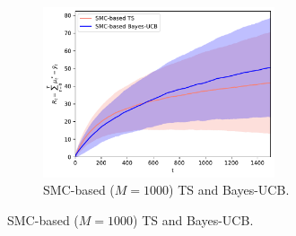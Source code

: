 \begin{figure}[!h]
	\centering
	\begin{subfigure}[b]{\textwidth}
		\centering
		\includegraphics[width=0.75\textwidth]{./fods_figs/static/logistic/A5/theta-1._-1._-0.5_-0.5_0._0._0.5_0.5_1._1._M1000_cumulative_regret}
		\caption{SMC-based ($M=1000$) TS and Bayes-UCB.}
	\end{subfigure}
	

\end{figure}
